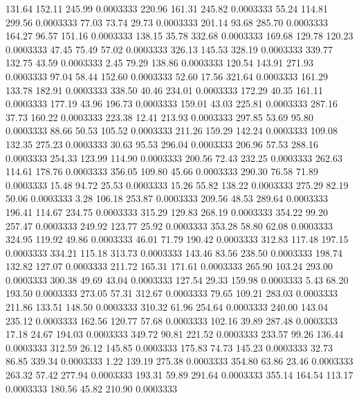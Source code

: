 131.64  152.11  245.99   0.0003333
 220.96  161.31  245.82   0.0003333
  55.24  114.81  299.56   0.0003333
  77.03   73.74   29.73   0.0003333
 201.14   93.68  285.70   0.0003333
 164.27   96.57  151.16   0.0003333
 138.15   35.78  332.68   0.0003333
 169.68  129.78  120.23   0.0003333
  47.45   75.49   57.02   0.0003333
 326.13  145.53  328.19   0.0003333
 339.77  132.75   43.59   0.0003333
   2.45   79.29  138.86   0.0003333
 120.54  143.91  271.93   0.0003333
  97.04   58.44  152.60   0.0003333
  52.60   17.56  321.64   0.0003333
 161.29  133.78  182.91   0.0003333
 338.50   40.46  234.01   0.0003333
 172.29   40.35  161.11   0.0003333
 177.19   43.96  196.73   0.0003333
 159.01   43.03  225.81   0.0003333
 287.16   37.73  160.22   0.0003333
 223.38   12.41  213.93   0.0003333
 297.85   53.69   95.80   0.0003333
  88.66   50.53  105.52   0.0003333
 211.26  159.29  142.24   0.0003333
 109.08  132.35  275.23   0.0003333
  30.63   95.53  296.04   0.0003333
 206.96   57.53  288.16   0.0003333
 254.33  123.99  114.90   0.0003333
 200.56   72.43  232.25   0.0003333
 262.63  114.61  178.76   0.0003333
 356.05  109.80   45.66   0.0003333
 290.30   76.58   71.89   0.0003333
  15.48   94.72   25.53   0.0003333
  15.26   55.82  138.22   0.0003333
 275.29   82.19   50.06   0.0003333
   3.28  106.18  253.87   0.0003333
 209.56   48.53  289.64   0.0003333
 196.41  114.67  234.75   0.0003333
 315.29  129.83  268.19   0.0003333
 354.22   99.20  257.47   0.0003333
 249.92  123.77   25.92   0.0003333
 353.28   58.80   62.08   0.0003333
 324.95  119.92   49.86   0.0003333
  46.01   71.79  190.42   0.0003333
 312.83  117.48  197.15   0.0003333
 334.21  115.18  313.73   0.0003333
 143.46   83.56  238.50   0.0003333
 198.74  132.82  127.07   0.0003333
 211.72  165.31  171.61   0.0003333
 265.90  103.24  293.00   0.0003333
 300.38   49.69   43.04   0.0003333
 127.54   29.33  159.98   0.0003333
   5.43   68.20  193.50   0.0003333
 273.05   57.31  312.67   0.0003333
  79.65  109.21  283.03   0.0003333
 211.86  133.51  148.50   0.0003333
 310.32   61.96  254.64   0.0003333
 240.00  143.04  235.12   0.0003333
 162.56  120.77   57.68   0.0003333
 102.16   39.89  287.48   0.0003333
  17.18   24.67  194.03   0.0003333
 349.72   90.81  221.52   0.0003333
 233.57   99.26  136.44   0.0003333
 312.59   26.12  145.85   0.0003333
 175.83   74.73  145.23   0.0003333
  32.73   86.85  339.34   0.0003333
   1.22  139.19  275.38   0.0003333
 354.80   63.86   23.46   0.0003333
 263.32   57.42  277.94   0.0003333
 193.31   59.89  291.64   0.0003333
 355.14  164.54  113.17   0.0003333
 180.56   45.82  210.90   0.0003333
